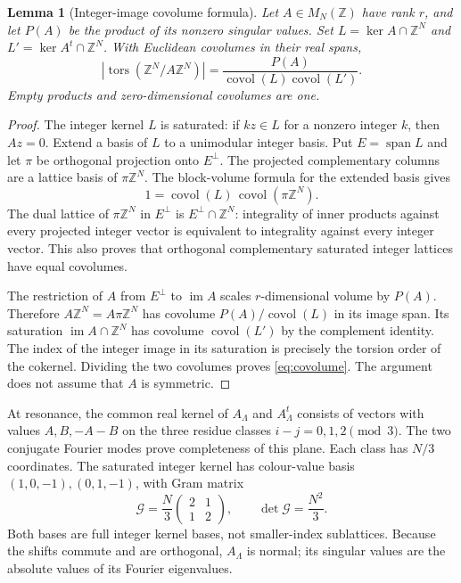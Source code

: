 \documentclass[10pt]{article}
\newcommand{\Z}{\mathbb Z}
\newcommand{\covol}{\operatorname{covol}}
\newcommand{\tors}{\operatorname{tors}}
\newtheorem{lemma}{Lemma}
\begin{document}
\begin{lemma}[Integer-image covolume formula]\label{lem:covolume}
Let $A\in M_N(\Z)$ have rank $r$, and let $P(A)$ be the product of its
nonzero singular values. Set $L=\ker A\cap\Z^N$ and
$L'=\ker A^t\cap\Z^N$. With Euclidean covolumes in their real spans,
\begin{equation}\label{eq:covolume}
 |\tors(\Z^N/A\Z^N)|
 =\frac{P(A)}{\covol(L)\covol(L')}.
\end{equation}
Empty products and zero-dimensional covolumes are one.
\end{lemma}
\begin{proof}
The integer kernel $L$ is saturated: if $kz\in L$ for a nonzero integer
$k$, then $Az=0$. Extend a basis of $L$ to a unimodular integer basis.
Put $E=\operatorname{span}L$ and let $\pi$ be orthogonal projection onto
$E^\perp$. The projected complementary columns are a lattice basis of
$\pi\Z^N$. The block-volume formula for the extended basis gives
\[
 1=\covol(L)\,\covol(\pi\Z^N).
\]
The dual lattice of $\pi\Z^N$ in $E^\perp$ is $E^\perp\cap\Z^N$:
integrality of inner products against every projected integer vector is
equivalent to integrality against every integer vector. This also proves
that orthogonal complementary saturated integer lattices have equal
covolumes.

The restriction of $A$ from $E^\perp$ to $\operatorname{im}A$ scales
$r$-dimensional volume by $P(A)$. Therefore $A\Z^N=A\pi\Z^N$ has
covolume $P(A)/\covol(L)$ in its image span. Its saturation
$\operatorname{im}A\cap\Z^N$ has covolume $\covol(L')$ by the
complement identity. The index of the integer image in its saturation
is precisely the torsion order of the cokernel. Dividing the two
covolumes proves \eqref{eq:covolume}. The argument does not assume
that $A$ is symmetric.
\end{proof}

At resonance, the common real kernel of $A_\Lambda$ and $A_\Lambda^t$
consists of vectors with values $A,B,-A-B$ on the three residue classes
$i-j=0,1,2\pmod3$. The two conjugate Fourier modes prove completeness
of this plane. Each class has $N/3$ coordinates. The saturated integer
kernel has colour-value basis $(1,0,-1),(0,1,-1)$, with Gram matrix
\begin{equation}\label{eq:gram}
 \mathcal G=\frac N3\begin{pmatrix}2&1\\1&2\end{pmatrix},
 \qquad\det\mathcal G=\frac{N^2}{3}.
\end{equation}
Both bases are full integer kernel bases, not smaller-index sublattices.
Because the shifts commute and are orthogonal, $A_\Lambda$ is normal;
its singular values are the absolute values of its Fourier eigenvalues.
\end{document}
